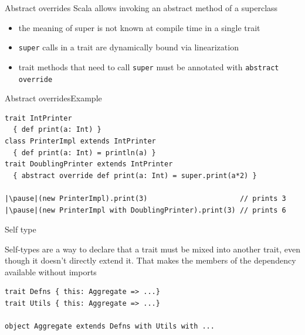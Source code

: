 \documentclass[aspectratio=169]{beamer}
\begin{document}
\begin{frame}[fragile]{Abstract overrides}
  Scala allows invoking an abstract method of a superclass
\begin{itemize}
  \item the meaning of super is not known at compile time in a single trait
  \item \texttt{super} calls in a trait are dynamically bound via linearization
  \item trait methods that need to call \texttt{super} must be annotated with \texttt{abstract
    override}
\end{itemize}
\end{frame}

\begin{frame}[fragile]{Abstract overrides}{Example}
\begin{verbatim}
trait IntPrinter
  { def print(a: Int) }
class PrinterImpl extends IntPrinter
  { def print(a: Int) = println(a) }
trait DoublingPrinter extends IntPrinter
  { abstract override def print(a: Int) = super.print(a*2) }

|\pause|(new PrinterImpl).print(3)                      // prints 3
|\pause|(new PrinterImpl with DoublingPrinter).print(3) // prints 6
\end{verbatim}
\end{frame}

\begin{frame}[fragile]{Self type}
\begin{block}{}
Self-types are a way to declare that a trait must be mixed into another trait, even though it
doesn’t directly extend it. That makes the members of the dependency available without imports
\end{block}
\vspace{2em}
\pause
\begin{verbatim}
trait Defns { this: Aggregate => ...}
trait Utils { this: Aggregate => ...}

object Aggregate extends Defns with Utils with ...
\end{verbatim}
\end{frame}
\end{document}
